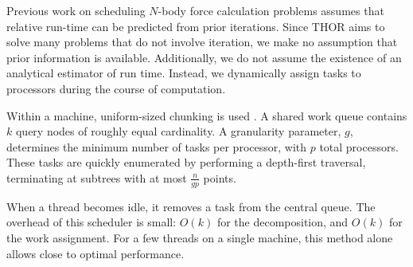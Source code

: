 \documentclass[twoside,leqno,twocolumn]{article}
\newcommand{\authornote}[1]{(\footnote{Note to self: #1})}
\newcommand{\authorsnote}[1]{\authornote{#1}}
\begin{document}
Previous work \cite{salmon_thesis, singh_thesis} on scheduling $N$-body force calculation problems assumes that relative run-time can be predicted from prior iterations.
Since THOR aims to solve many problems that do not involve iteration, we make no assumption that prior information is available.
Additionally, we do not assume the existence of an analytical estimator of run time.
Instead, we dynamically assign tasks to processors during the course of computation.


Within a machine, uniform-sized chunking is used \cite{kruskal85allocating}.
A shared work queue contains $k$ query nodes of roughly equal cardinality.
A granularity parameter, $g$, determines the minimum number of tasks per processor, with $p$ total processors.
These tasks are quickly enumerated by performing a depth-first traversal, terminating at subtrees with at most $\frac{n}{gp}$ points.

When a thread becomes idle, it removes a task from the central queue.
The overhead of this scheduler is small: $O(k)$ for the decomposition, and $O(k)$ for the work assignment.
For a few threads on a single machine, this method alone allows close to optimal performance.
\end{document}
